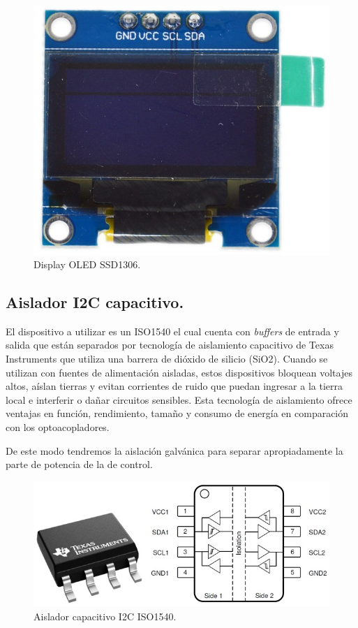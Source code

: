 \begin{figure}[H]
    \centering 
    \includegraphics[scale=0.3]{./imagenes/display.jpg}
    \caption{Display OLED SSD1306.}
    \label{F:display}
\end{figure}

\subsection{Aislador I2C capacitivo.}
El dispositivo a utilizar es un ISO1540 \cite{ISO1540} el cual cuenta con \textit{buffers} de entrada y salida que están separados por tecnología de aislamiento capacitivo de Texas Instruments que utiliza una barrera de dióxido de silicio (SiO2). Cuando se utilizan con fuentes de alimentación aisladas, estos dispositivos bloquean voltajes altos, aíslan tierras y evitan corrientes de ruido que puedan ingresar a la tierra local e interferir o dañar circuitos sensibles. Esta tecnología de aislamiento ofrece ventajas en función, rendimiento, tamaño y consumo de energía en comparación con los optoacopladores. \par 
De este modo tendremos la aislación galvánica para separar apropiadamente la parte de potencia de la de control.
\begin{figure}[H]
    \centering
    \includegraphics[scale=0.5]{./imagenes/optoi2c.jpg}
    \caption{Aislador capacitivo I2C ISO1540.}
    \label{F:optoi2c}
\end{figure}

